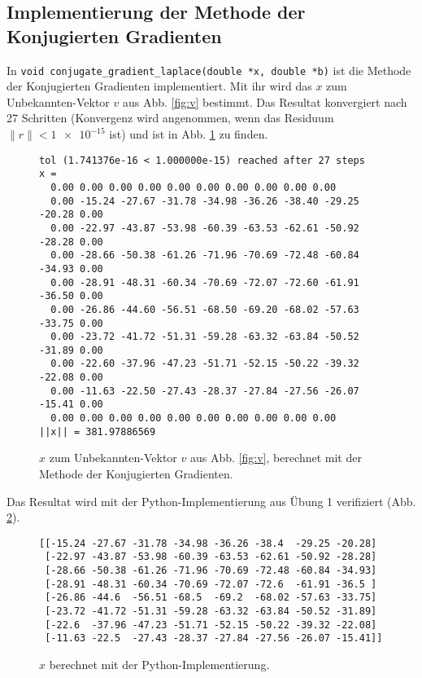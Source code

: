 \documentclass[10pt,a4paper]{article}
\begin{document}
\subsection{Implementierung der Methode der Konjugierten Gradienten}

In \texttt{void conjugate\_gradient\_laplace(double *x, double *b)} ist die
Methode der Konjugierten Gradienten implementiert. Mit ihr wird das $x$ zum
Unbekannten-Vektor $v$ aus Abb. \ref{fig:v} bestimmt. Das Resultat konvergiert
nach 27 Schritten (Konvergenz wird angenommen, wenn das Residuum $\|r\| <
\num{1e-15}$ ist) und ist in Abb. \ref{fig:converged_x} zu finden.

\begin{figure}[H]
  \centering
\begin{verbatim}
tol (1.741376e-16 < 1.000000e-15) reached after 27 steps
x = 
  0.00 0.00 0.00 0.00 0.00 0.00 0.00 0.00 0.00 0.00 
  0.00 -15.24 -27.67 -31.78 -34.98 -36.26 -38.40 -29.25 -20.28 0.00 
  0.00 -22.97 -43.87 -53.98 -60.39 -63.53 -62.61 -50.92 -28.28 0.00 
  0.00 -28.66 -50.38 -61.26 -71.96 -70.69 -72.48 -60.84 -34.93 0.00 
  0.00 -28.91 -48.31 -60.34 -70.69 -72.07 -72.60 -61.91 -36.50 0.00 
  0.00 -26.86 -44.60 -56.51 -68.50 -69.20 -68.02 -57.63 -33.75 0.00 
  0.00 -23.72 -41.72 -51.31 -59.28 -63.32 -63.84 -50.52 -31.89 0.00 
  0.00 -22.60 -37.96 -47.23 -51.71 -52.15 -50.22 -39.32 -22.08 0.00 
  0.00 -11.63 -22.50 -27.43 -28.37 -27.84 -27.56 -26.07 -15.41 0.00 
  0.00 0.00 0.00 0.00 0.00 0.00 0.00 0.00 0.00 0.00 
||x|| = 381.97886569
\end{verbatim}
  \caption{$x$ zum Unbekannten-Vektor $v$ aus Abb. \ref{fig:v}, berechnet mit
    der Methode der Konjugierten Gradienten.}
  \label{fig:converged_x}
\end{figure}

Das Resultat wird mit der Python-Implementierung aus Übung 1 verifiziert (Abb.
\ref{fig:python_x}).

\begin{figure}[H]
  \centering
\begin{verbatim}
[[-15.24 -27.67 -31.78 -34.98 -36.26 -38.4  -29.25 -20.28]
 [-22.97 -43.87 -53.98 -60.39 -63.53 -62.61 -50.92 -28.28]
 [-28.66 -50.38 -61.26 -71.96 -70.69 -72.48 -60.84 -34.93]
 [-28.91 -48.31 -60.34 -70.69 -72.07 -72.6  -61.91 -36.5 ]
 [-26.86 -44.6  -56.51 -68.5  -69.2  -68.02 -57.63 -33.75]
 [-23.72 -41.72 -51.31 -59.28 -63.32 -63.84 -50.52 -31.89]
 [-22.6  -37.96 -47.23 -51.71 -52.15 -50.22 -39.32 -22.08]
 [-11.63 -22.5  -27.43 -28.37 -27.84 -27.56 -26.07 -15.41]]
\end{verbatim}
  \caption{$x$ berechnet mit der Python-Implementierung.}
  \label{fig:python_x}
\end{figure}
\end{document}

